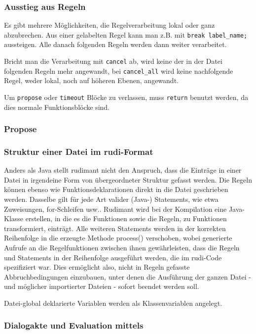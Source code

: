 \subsubsection{Ausstieg aus Regeln}

Es gibt mehrere Möglichkeiten, die Regelverarbeitung lokal oder ganz
abzubrechen. Aus einer gelabelten Regel kann man z.B. mit \texttt{break
  label_name;} aussteigen. Alle danach folgenden Regeln werden dann
weiter verarbeitet.

Bricht man die Verarbeitung mit \texttt{cancel} ab, wird keine der in
der Datei folgenden Regeln mehr angewandt, bei \texttt{cancel_all} wird
keine nachfolgende Regel, weder lokal, noch auf höheren Ebenen, angewandt.

Um \texttt{propose} oder \texttt{timeout} Blöcke zu verlassen, muss
\texttt{return} benutzt werden, da dies normale Funktionsblöcke sind.

\subsubsection{Propose}

\subsubsection{Struktur einer Datei im rudi-Format}

Anders als Java stellt rudimant nicht den Anspruch, dass die Einträge in einer
Datei in irgendeine Form von übergeordneter Struktur gefasst werden. Die Regeln
können ebenso wie Funktionsdeklarationen direkt in die Datei geschrieben
werden. Dasselbe gilt für jede Art valider (Java-) Statements, wie etwa
Zuweisungen, for-Schleifen usw.. Rudimant wird bei der Kompilation eine
Java-Klasse erstellen, in die es die Funktionen sowie die Regeln, zu Funktionen
transformiert, einträgt. Alle weiteren Statements werden in der korrekten
Reihenfolge in die erzeugte Methode process() verschoben, wobei generierte
Aufrufe an die Regelfunktionen zwischen ihnen gewährleisten, dass die Regeln
und Statements in der Reihenfolge ausgeführt werden, die im rudi-Code
spezifiziert war. Dies ermöglicht also, nicht in Regeln gefasste
Abbruchbedingungen einzubauen, unter denen die Ausführung der ganzen Datei -
und möglicher importierter Dateien - sofort beendet werden soll.

Datei-global deklarierte Variablen werden als Klassenvariablen angelegt.

\subsubsection{Dialogakte und Evaluation mittels \caret}
\label{sub:caret}

